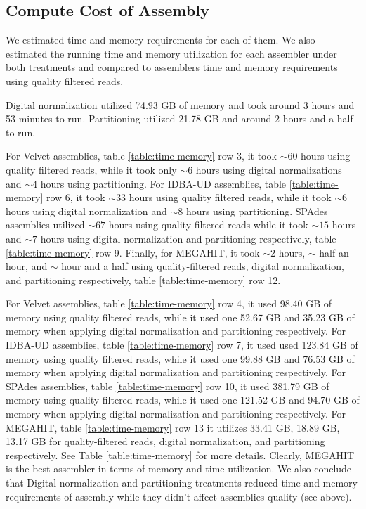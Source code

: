 \subsection*{Compute Cost of Assembly} 
We estimated time and memory requirements for each of them. We also estimated the running time and memory utilization for each assembler under both treatments and compared to assemblers time and memory requirements using quality filtered reads.  

Digital normalization utilized 74.93 GB of memory and took around 3
hours and 53 minutes to run. Partitioning utilized 21.78 GB and around
2 hours and a half to run. %

For Velvet assemblies, table \ref{table:time-memory} row 3, it took $\sim 60$ hours using quality filtered reads, while it took only $\sim 6$ hours using digital normalizations
and $\sim 4$ hours using partitioning.  For IDBA-UD assemblies, table \ref{table:time-memory} row 6, it took $\sim 33$ hours using quality filtered reads, while it took $\sim 6$
hours using digital normalization and $\sim 8$ hours using
partitioning.  SPAdes assemblies utilized $\sim 67$ hours using quality
filtered reads while it took $\sim15$ hours and $\sim 7$ hours using
digital normalization and partitioning respectively, table \ref{table:time-memory} row 9. Finally, for
MEGAHIT, it took $\sim 2$ hours, $\sim$ half an hour, and $\sim$ hour
and a half using quality-filtered reads, digital normalization, and
partitioning respectively, table \ref{table:time-memory} row 12.
 
For Velvet assemblies, table \ref{table:time-memory} row 4, it used 98.40 GB of memory using quality
filtered reads, while it used one 52.67 GB and 35.23 GB of memory when
applying digital normalization and partitioning respectively. For IDBA-UD
assemblies, table \ref{table:time-memory} row 7, it used used 123.84 GB of memory using quality filtered
reads, while it used one 99.88 GB and 76.53 GB of memory when applying
digital normalization and partitioning respectively. For SPAdes
assemblies, table \ref{table:time-memory} row 10, it used 381.79 GB of memory using quality filtered reads,
while it used one 121.52 GB and 94.70 GB of memory when applying
digital normalization and partitioning respectively.  For MEGAHIT, table \ref{table:time-memory} row 13 it
utilizes 33.41 GB, 18.89 GB, 13.17 GB for quality-filtered reads,
digital normalization, and partitioning respectively. See Table
\ref{table:time-memory} for more details. Clearly, MEGAHIT is the
best assembler in terms of memory and time utilization. We also
conclude that Digital normalization and partitioning treatments
reduced time and memory requirements of assembly while they didn't
affect assemblies quality (see above).

